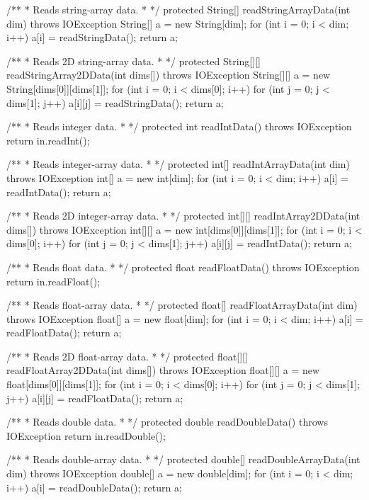 \begin{code}
\begin{hide}
{   /**
    * Reads string-array data.
    *
    */
   protected String[] readStringArrayData(int dim) throws IOException {
      String[] a = new String[dim];
      for (int i = 0; i < dim; i++)
         a[i] = readStringData();
      return a;
   }

   /**
    * Reads 2D string-array data.
    *
    */
   protected String[][] readStringArray2DData(int dims[]) throws IOException {
      String[][] a = new String[dims[0]][dims[1]];
      for (int i = 0; i < dims[0]; i++)
         for (int j = 0; j < dims[1]; j++)
            a[i][j] = readStringData();
      return a;
   }


   /**
    * Reads integer data.
    *
    */    
   protected int readIntData() throws IOException {
      return in.readInt();
   }
      
   /**
    * Reads integer-array data.
    *
    */
   protected int[] readIntArrayData(int dim) throws IOException {
      int[] a = new int[dim];
      for (int i = 0; i < dim; i++)
         a[i] = readIntData();
      return a;
   }

   /**
    * Reads 2D integer-array data.
    *
    */
   protected int[][] readIntArray2DData(int dims[]) throws IOException {
      int[][] a = new int[dims[0]][dims[1]];
      for (int i = 0; i < dims[0]; i++)
         for (int j = 0; j < dims[1]; j++)
            a[i][j] = readIntData();
      return a;
   }


   /**
    * Reads float data.
    *
    */    
   protected float readFloatData() throws IOException {
      return in.readFloat();
   }
      
   /**
    * Reads float-array data.
    *
    */
   protected float[] readFloatArrayData(int dim) throws IOException {
      float[] a = new float[dim];
      for (int i = 0; i < dim; i++)
         a[i] = readFloatData();
      return a;
   }

   /**
    * Reads 2D float-array data.
    *
    */
   protected float[][] readFloatArray2DData(int dims[]) throws IOException {
      float[][] a = new float[dims[0]][dims[1]];
      for (int i = 0; i < dims[0]; i++)
         for (int j = 0; j < dims[1]; j++)
            a[i][j] = readFloatData();
      return a;
   }


   /**
    * Reads double data.
    *
    */    
   protected double readDoubleData() throws IOException {
      return in.readDouble();
   }
      
   /**
    * Reads double-array data.
    *
    */
   protected double[] readDoubleArrayData(int dim) throws IOException {
      double[] a = new double[dim];
      for (int i = 0; i < dim; i++)
         a[i] = readDoubleData();
      return a;
   }

}
\end{hide}
\end{code}
